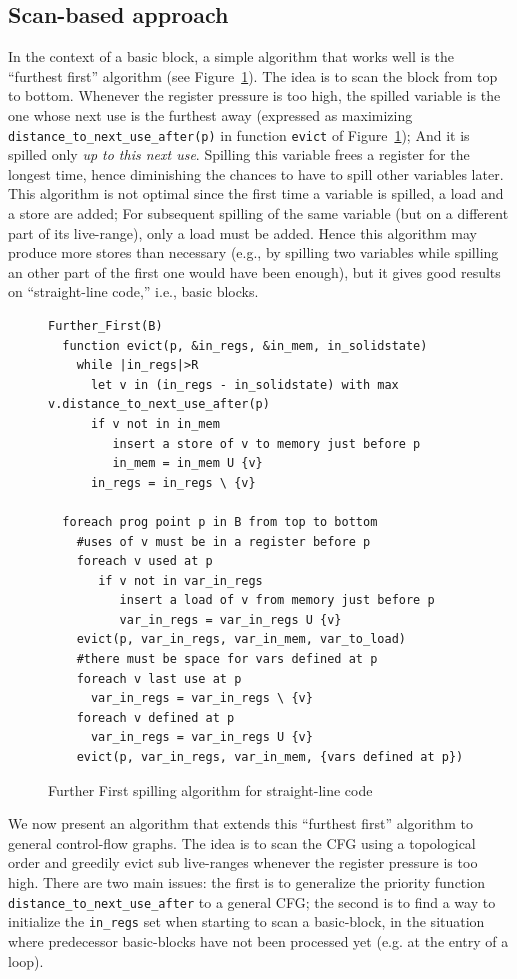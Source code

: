 {\subsection{Scan-based approach}
In the context of a basic block, a simple algorithm that works well is the ``furthest first'' algorithm (see Figure~\ref{fig:ra:ff}). 
The idea is to scan the block from top to bottom.
Whenever the register pressure is too high, the spilled variable is the one whose next use is the furthest away (expressed as maximizing \verb+distance_to_next_use_after(p)+ in function \verb+evict+ of Figure~\ref{fig:ra:ff}); 
And it is spilled only \emph{up to this next use}. 
Spilling this variable frees a register for the longest time, hence diminishing the chances to have to spill other variables later. 
This algorithm is not optimal since the first time a variable is spilled, a load and a store are added; 
For subsequent spilling of the same variable (but on a different part of its live-range), only a load must be added. 
Hence this algorithm may produce more stores than necessary (e.g., by spilling two variables while spilling an other part of the first one would have been enough), but it gives good results on ``straight-line code,'' i.e., basic blocks.

\begin{figure}
\begin{verbatim}
Further_First(B)
  function evict(p, &in_regs, &in_mem, in_solidstate)
    while |in_regs|>R
      let v in (in_regs - in_solidstate) with max v.distance_to_next_use_after(p)
      if v not in in_mem 
         insert a store of v to memory just before p
         in_mem = in_mem U {v}
      in_regs = in_regs \ {v}

  foreach prog point p in B from top to bottom
    #uses of v must be in a register before p
    foreach v used at p
       if v not in var_in_regs 
          insert a load of v from memory just before p
          var_in_regs = var_in_regs U {v}
    evict(p, var_in_regs, var_in_mem, var_to_load)
    #there must be space for vars defined at p
    foreach v last use at p  
      var_in_regs = var_in_regs \ {v}
    foreach v defined at p
      var_in_regs = var_in_regs U {v}
    evict(p, var_in_regs, var_in_mem, {vars defined at p})
\end{verbatim}
\caption{\label{fig:ra:ff}Further First spilling algorithm for straight-line code}
\end{figure}

We now present an algorithm that extends this ``furthest first'' algorithm to general control-flow graphs.
The idea is to scan the CFG using a topological order and greedily evict sub live-ranges whenever the register pressure is too high.
There are two main issues:
the first is to generalize the priority function \verb+distance_to_next_use_after+ to a general CFG;
the second is to find a way to initialize the \verb+in_regs+ set when starting to scan a basic-block, in the situation where predecessor basic-blocks have not been processed yet (e.g. at the entry of a loop).

}
